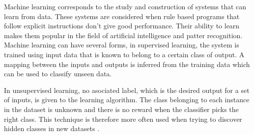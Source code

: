 Machine learning corresponds to the study and construction of systems that can learn from data. These systems are considered when rule based programs that follow explicit instructions don't give good performance. Their ability to learn makes them popular in the field of artificial intelligence and patter recognition. Machine learning can have several forms, in supervised learning, the system is trained using input data that is known to belong to a certain class of output. A mapping between the inputs and outputs is inferred from the training data which can be used to classify unseen data.\cite{cord2008machine}

In unsupervised learning, no asociated label, which is the desired output for a set of inputs, is given to the learning algorithm. The class belonging to each instance in the dataset is unknown and there is no reward when the classifier picks the right class. This technique is therefore more often used when trying to discover hidden classes in new datasets \cite{maglogiannis2007emerging}.






